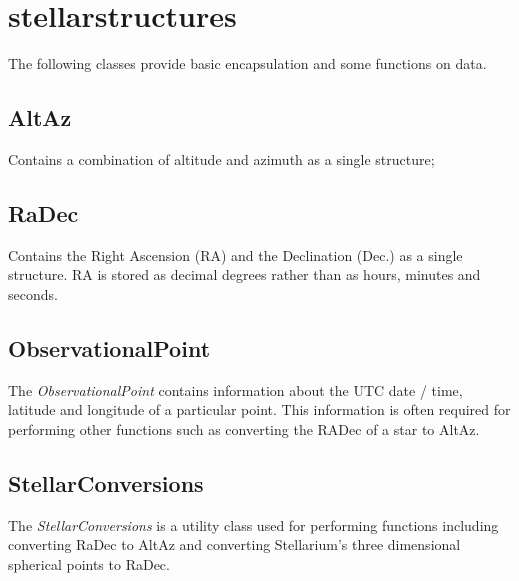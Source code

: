 \section{stellarstructures} \label{sec:stellarstructures}
The following classes provide basic encapsulation and some functions on data.

\subsection{AltAz}
Contains a combination of altitude and azimuth as a single structure;

\subsection{RaDec}\label{sec:RaDec}
Contains the Right Ascension (RA) and the Declination (Dec.) as a single structure. RA is stored as decimal degrees rather than as hours, minutes and seconds.

\subsection{ObservationalPoint}
The \textit{ObservationalPoint} contains information about the UTC date / time, latitude and longitude of a particular point. This information is often required for performing other functions such as converting the RADec of a star to AltAz.

\subsection{StellarConversions}
 The \textit{StellarConversions} is a utility class used for performing functions including converting RaDec to AltAz and converting Stellarium's three dimensional spherical points to RaDec.
 

